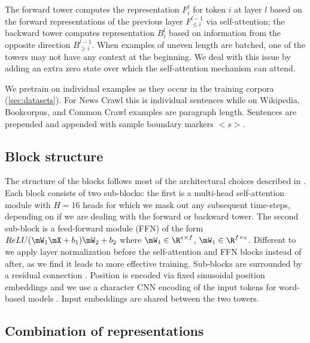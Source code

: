 \documentclass[11pt,a4paper]{article}
\begin{document}
The forward tower computes the representation $F^l_i$ for token $i$ at layer $l$ based on the forward representations of the previous layer $F^{l-1}_{\le i}$ via self-attention; the backward tower computes representation $B^l_i$ based on information from the opposite direction $B^{l-1}_{\ge i}$.
When examples of uneven length are batched, one of the towers may not have any context at the beginning. 
We deal with this issue by adding an extra zero state over which the self-attention mechanism can attend.

We pretrain on individual examples as they occur in the training corpora (\textsection\ref{sec:datasets}).
For News Crawl this is individual sentences while on Wikipedia, Bookcorpus, and Common Crawl examples are paragraph length.
Sentences are prepended and appended with sample boundary markers $<s>$.



\subsection{Block structure}
\label{sec:block}
The structure of the blocks follows most of the architectural choices described in \citet{vaswani2017transformer}.
Each block consists of two sub-blocks: the first is a multi-head self-attention module with $H=16$ heads for which we mask out any subsequent time-steps, depending on if we are dealing with the forward or backward tower.
The second sub-block is a feed-forward module (FFN) of the form $ReLU(\mW_1 \mX + b_1) \mW_2 + b_2$ where $\mW_1 \in \R^{e \times f}$, $\mW_1 \in \R^{f \times e}$.
Different to \citet{vaswani2017transformer} we apply layer normalization before the self-attention and FFN blocks instead of after, as we find it leads to more effective training.
Sub-blocks are surrounded by a residual connection \citep{he2015deep}.
Position is encoded via fixed sinusoidal position embeddings and we use a character CNN encoding of the input tokens for word-based models \citep{kim2016character}.
Input embeddings are shared between the two towers.

\subsection{Combination of representations}
\end{document}
